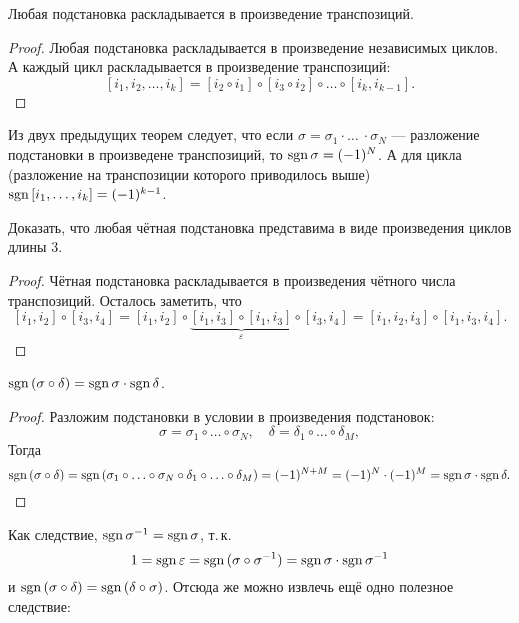\begin{theorem}
    Любая подстановка раскладывается в произведение транспозиций.
\end{theorem}

\begin{proof}
    Любая подстановка раскладывается в произведение независимых циклов. А каждый цикл раскладывается в произведение транспозиций:
    $$
    [i_1, i_2, \ldots, i_k] = [i_2 \circ i_1] \circ [i_3 \circ i_2] \circ \ldots \circ [i_k, i_{k - 1}].
    $$
\end{proof}

\begin{remark}
    Из двух предыдущих теорем следует, что если $\sigma = \sigma_1 \cdot \ldots\ \cdot \sigma_N$ --- разложение подстановки в произведене транспозиций, то $\mathrm{sgn}\,\sigma = (-1)^N$. А для цикла (разложение на транспозиции которого приводилось выше) $\mathrm{sgn}\,[i_1, \ldots, i_k] = (-1)^{k - 1}$.
\end{remark}

\begin{statement}
    Доказать, что любая чётная подстановка представима в виде произведения циклов длины 3.
\end{statement}

\begin{proof}
    Чётная подстановка раскладывается в произведения чётного числа транспозиций. Осталось заметить, что
    $$
    [i_1, i_2] \circ [i_3, i_4] = [i_1, i_2] \circ \underbrace{[i_1, i_3] \circ [i_1, i_3]}_{\varepsilon} \circ [i_3, i_4] = [i_1, i_2, i_3] \circ [i_1, i_3, i_4].
    $$
\end{proof}

\begin{theorem}
    $\mathrm{sgn}\,(\sigma \circ \delta) = \mathrm{sgn}\,\sigma \cdot \mathrm{sgn}\,\delta$.
\end{theorem}

\begin{proof}
    Разложим подстановки в условии в произведения подстановок:
    $$
    \sigma = \sigma_1 \circ \ldots \circ \sigma_N,\quad\delta = \delta_1 \circ \ldots \circ \delta_M,
    $$
    Тогда
    $$
    \mathrm{sgn}\,(\sigma \circ \delta) = \mathrm{sgn}\,(\sigma_1 \circ \ldots \circ \sigma_N \circ \delta_1 \circ \ldots \circ \delta_M) = (-1)^{N + M} = (-1)^N \cdot (-1)^M = \mathrm{sgn}\,\sigma \cdot \mathrm{sgn}\,\delta.
    $$
\end{proof}

\begin{remark}
    Как следствие, $\mathrm{sgn}\,\sigma^{-1} = \mathrm{sgn}\,\sigma$, т.\,к.
    $$
    1 = \mathrm{sgn}\,\varepsilon = \mathrm{sgn}\,(\sigma \circ \sigma^{-1}) = \mathrm{sgn}\,\sigma \cdot \mathrm{sgn}\,\sigma^{-1}
    $$
    и $\mathrm{sgn}\,(\sigma \circ \delta) = \mathrm{sgn}\,(\delta \circ \sigma)$. Отсюда же можно извлечь ещё одно полезное следствие:
\end{remark}

